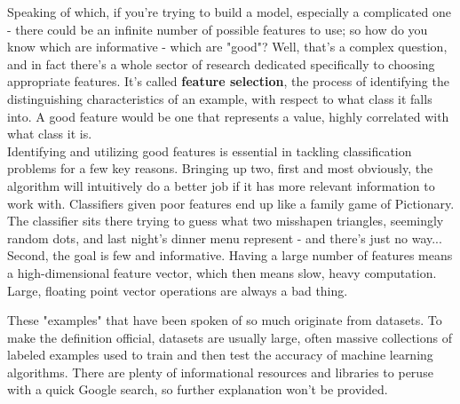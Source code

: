 \documentclass[12pt,letterpaper]{article}
\begin{document}
			Speaking of which, if you're trying to build a model, especially a complicated one - there could be an infinite number of possible features to use; so how do you know which are informative - which are "good"? Well, that's a complex question, and in fact there's a whole sector of research dedicated specifically to choosing appropriate features. 
			It's called \textbf{feature selection}, the process of identifying the distinguishing characteristics of an example, with respect to what class it falls into. A good feature would be one that represents a value, highly correlated with what class it is.\\
			Identifying and utilizing good features is essential in tackling classification problems for a few key reasons. Bringing up two, first and most obviously, the algorithm will intuitively do a better job if it has more relevant information to work with. Classifiers given poor features end up like a family game of Pictionary. The classifier sits there trying to guess what two misshapen triangles, seemingly random dots, and last night's dinner menu represent - and there's just no way... Second, the goal is few and informative. Having a large number of features means a high-dimensional feature vector, which then means slow, heavy computation. Large, floating point vector operations are always a bad thing. 
			
			These "examples" that have been spoken of so much originate from datasets. To make the definition official, datasets are usually large, often massive collections of labeled examples used to train and then test the accuracy of machine learning algorithms. There are plenty of informational resources and libraries to peruse with a quick Google search, so further explanation won't be provided.
\end{document}

